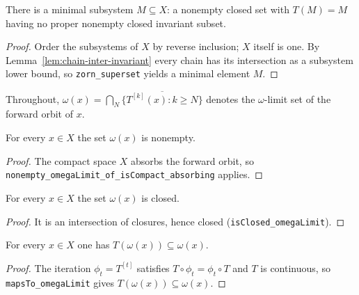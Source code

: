 \begin{lemma}
    \label{lem:exists-minimal-subsystem}
    \leanok
    There is a minimal subsystem $M \subseteq X$: a nonempty closed set with
    $T(M) = M$ having no proper nonempty closed invariant subset.
\end{lemma}
\begin{proof}
    Order the subsystems of $X$ by reverse inclusion; $X$ itself is one. By
    Lemma~\ref{lem:chain-inter-invariant} every chain has its intersection as a
    subsystem lower bound, so \texttt{zorn\_superset} yields a minimal element
    $M$.
\end{proof}

Throughout, $\omega(x) = \bigcap_{N} \overline{\{T^{[k]}(x) : k \ge N\}}$ denotes
the $\omega$-limit set of the forward orbit of $x$.

\begin{lemma}
    \label{lem:omega-nonempty}
    \leanok
    For every $x \in X$ the set $\omega(x)$ is nonempty.
\end{lemma}
\begin{proof}
    The compact space $X$ absorbs the forward orbit, so
    \texttt{nonempty\_omegaLimit\_of\_isCompact\_absorbing} applies.
\end{proof}

\begin{lemma}
    \label{lem:omega-closed}
    \leanok
    For every $x \in X$ the set $\omega(x)$ is closed.
\end{lemma}
\begin{proof}
    It is an intersection of closures, hence closed
    (\texttt{isClosed\_omegaLimit}).
\end{proof}

\begin{lemma}
    \label{lem:omega-forward-invariant}
    \leanok
    For every $x \in X$ one has $T(\omega(x)) \subseteq \omega(x)$.
\end{lemma}
\begin{proof}
    The iteration $\phi_t = T^{[t]}$ satisfies $T \circ \phi_t = \phi_t \circ T$
    and $T$ is continuous, so \texttt{mapsTo\_omegaLimit} gives
    $T(\omega(x)) \subseteq \omega(x)$.
\end{proof}

